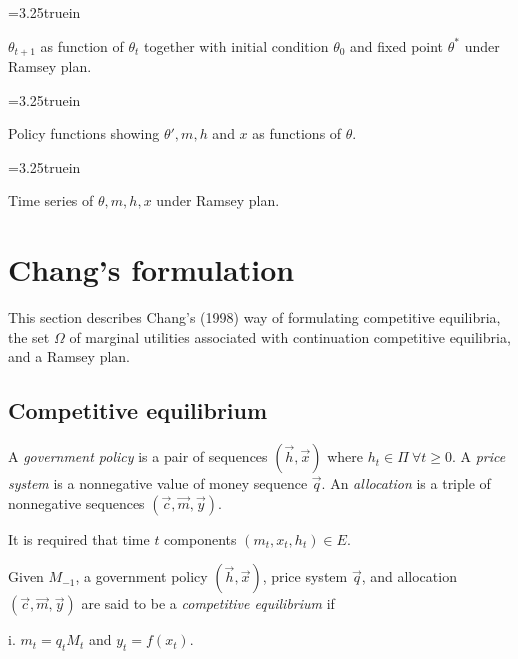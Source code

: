 \centerline{\epsfxsize=3.25truein}
\caption{$\theta_{t+1}$ as function of $\theta_t$ together with initial condition $\theta_0$ and fixed point $\theta^*$ under Ramsey plan.}
\endfigure

\centerline{\epsfxsize=3.25truein}
\caption{Policy functions showing $\theta', m, h$ and $x$ as functions of $\theta$.}
\endfigure

\centerline{\epsfxsize=3.25truein}
\caption{Time series of $\theta, m, h, x$ under Ramsey plan.}
\endfigure





\section{Chang's formulation}
This section describes Chang's (1998) way of formulating competitive equilibria,  the set $\Omega$ of marginal utilities
associated with continuation competitive equilibria, and a Ramsey plan.

\subsection{Competitive equilibrium}

\medskip

 A {\it government policy} is a pair of sequences $(\vec h,\vec x)$ where $h_t \in \Pi  \ \forall t \geq 0$. A {\it price system} is a nonnegative  value of money sequence
$\vec q$.  An {\it allocation\/} is a triple of nonnegative sequences $(\vec c, \vec m, \vec y)$.

\medskip

\noindent It is  required that time $t$ components $(m_t, x_t, h_t) \in E$. %

 Given $M_{-1}$, a government policy $(\vec h, \vec x)$, price system $\vec q$, and allocation
$(\vec c, \vec m, \vec y)$ are said to be  a  {\it competitive equilibrium\/} if

\item{i.} $m_t = q_t M_t $ and $y_t = f(x_t)$.


